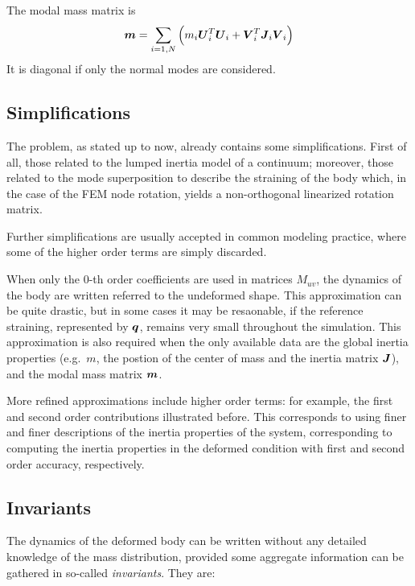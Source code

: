 The modal mass matrix is
\begin{equation}
	\boldsymbol{m} = \sum_{i=1,N} \left( 
		m_i \boldsymbol{U}_i^T \boldsymbol{U}_i
		+ \boldsymbol{V}_i^T \boldsymbol{J}_i \boldsymbol{V}_i
	 \right)
\end{equation}
It is diagonal if only the normal modes are considered.

\subsection{Simplifications}
The problem, as stated up to now, already contains some simplifications.
First of all, those related to the lumped inertia model of a continuum;
moreover, those related to the mode superposition to describe the
straining of the body which, in the case of the FEM node rotation,
yields a non-orthogonal linearized rotation matrix.

Further simplifications are usually accepted in common modeling practice,
where some of the higher order terms are simply discarded.

When only the 0-th order coefficients are used in matrices $M_{uv}$,
the dynamics of the body are written referred to the undeformed shape.
This approximation can be quite drastic, but in some cases it may be
resaonable, if the reference straining, represented by $\boldsymbol{q}$,
remains very small throughout the simulation.
This approximation is also required when the only available data
are the global inertia properties (e.g.\ $m$, the postion 
of the center of mass and the inertia matrix $\boldsymbol{J}$),
and the modal mass matrix $\boldsymbol{m}$.

More refined approximations include higher order terms: for example, the
first and second order contributions illustrated before.
This corresponds to using finer and finer descriptions of the inertia
properties of the system, corresponding to computing the inertia properties 
in the deformed condition with first and second order accuracy, respectively.

\subsection{Invariants}
The dynamics of the deformed body can be written without any detailed
knowledge of the mass distribution, provided some aggregate information
can be gathered in so-called \emph{invariants}.
They are:

